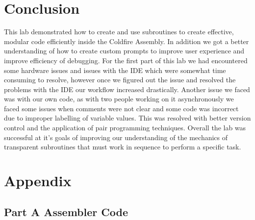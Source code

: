 \documentclass[letterpaper]{article}
\begin{document}
\section{Conclusion}
  This lab demonstrated how to create and use subroutines to create effective, modular code efficiently inside the Coldfire Assembly.  In addition we got a better understanding of how to create custom prompts to improve user experience and improve efficiency of debugging.  For the first part of this lab we had encountered some hardware issues and issues with the IDE which were somewhat time consuming to resolve, however once we figured out the issue and resolved the problems with the IDE our workflow increased drastically.  Another issue we faced was with our own code, as with two people working on it asynchronously we faced some issues when comments were not clear and some code was incorrect due to improper labelling of variable values.  This was resolved with better version control and the application of pair programming techniques.  Overall the lab was successful at it's goals of improving our understanding of the mechanics of transparent subroutines that must work in sequence to perform a specific task.

\newpage
\section{Appendix}
  \subsection{Part A Assembler Code}
    
\newpage
\end{document}
